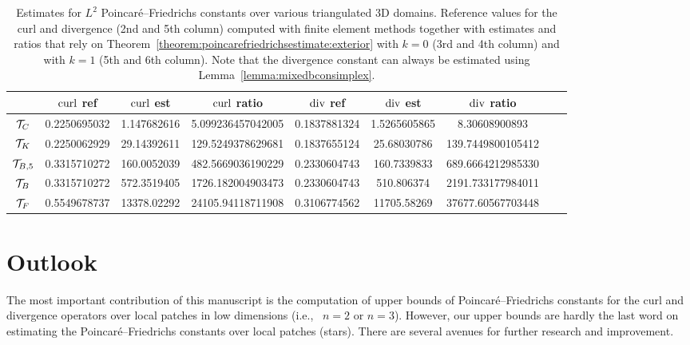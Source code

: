 \documentclass[10pt,a4paper]{article}
\begin{document}
\begin{table}[t]
    \color{red}
    \centering
    \begin{tabular}{|c|c|c|c|c|c|c|c|c|}
        \hline
                        & $\operatorname{curl}$ ref  & $\operatorname{curl}$ est & $\operatorname{curl}$ ratio     & $\operatorname{div}$ ref & $\operatorname{div}$ est & $\operatorname{div}$ ratio \\ 
        \hline
        ${\mathcal T}_{C}$     & 0.2250695032 & 1.147682616 & 5.099236457042005 & 0.1837881324      & 1.5265605865      &  8.30608900893      \\ 
        \hline
        ${\mathcal T}_{K}$     & 0.2250062929 & 29.14392611 & 129.5249378629681 & 0.1837655124      & 25.68030786       & 139.7449800105412   \\ 
        \hline
        ${\mathcal T}_{B,5}$   & 0.3315710272 & 160.0052039 & 482.5669036190229 & 0.2330604743      & 160.7339833       & 689.6664212985330   \\ 
        \hline
        ${\mathcal T}_{B}$     & 0.3315710272 & 572.3519405 & 1726.182004903473 & 0.2330604743      & 510.806374        & 2191.733177984011   \\ 
        \hline
        ${\mathcal T}_{F}$     & 0.5549678737 & 13378.02292 & 24105.94118711908 & 0.3106774562      & 11705.58269       & 37677.60567703448   \\ 
        \hline
    \end{tabular}
    \caption{
    Estimates for $L^2$ Poincar\'e--Friedrichs constants over various triangulated 3D domains.
    Reference values for the curl and divergence (2nd and 5th column) computed with finite element methods together with estimates and ratios
    that rely on Theorem~\ref{theorem:poincarefriedrichsestimate:exterior} with $k=0$ (3rd and 4th column) and with $k=1$ (5th and 6th column).
    Note that the divergence constant can always be estimated using Lemma~\ref{lemma:mixedbconsimplex}.
    }\label{table:estimates3D:curldiv}
\end{table}





\section{Outlook}\label{section:outlook}

The most important contribution of this manuscript is the computation of upper bounds of Poincar\'e--Friedrichs constants for the curl and divergence operators over local patches in low dimensions (i.e., \ $n=2$ or $n=3$). 
However, our upper bounds are hardly the last word on estimating the Poincar\'e--Friedrichs constants over local patches (stars). There are several avenues for further research and improvement. 
\end{document}
